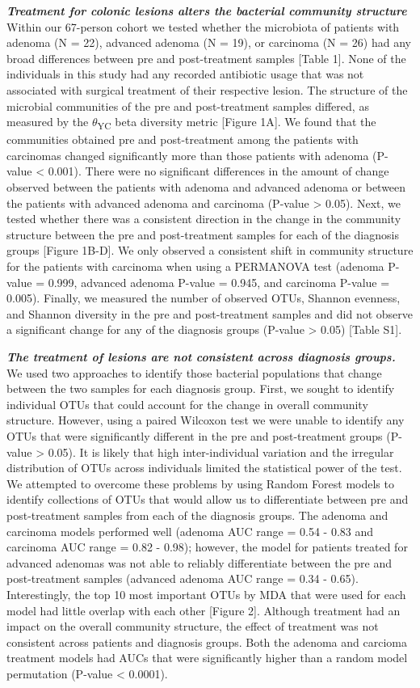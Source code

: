 \documentclass[12pt,]{article}
\begin{document}
\textbf{\emph{Treatment for colonic lesions alters the bacterial
community structure}} Within our 67-person cohort we tested whether the
microbiota of patients with adenoma (N = 22), advanced adenoma (N = 19),
or carcinoma (N = 26) had any broad differences between pre and
post-treatment samples {[}Table 1{]}. None of the individuals in this
study had any recorded antibiotic usage that was not associated with
surgical treatment of their respective lesion. The structure of the
microbial communities of the pre and post-treatment samples differed, as
measured by the \(\theta\)\textsubscript{YC} beta diversity metric
{[}Figure 1A{]}. We found that the communities obtained pre and
post-treatment among the patients with carcinomas changed significantly
more than those patients with adenoma (P-value \textless{} 0.001). There
were no significant differences in the amount of change observed between
the patients with adenoma and advanced adenoma or between the patients
with advanced adenoma and carcinoma (P-value \textgreater{} 0.05). Next,
we tested whether there was a consistent direction in the change in the
community structure between the pre and post-treatment samples for each
of the diagnosis groups {[}Figure 1B-D{]}. We only observed a consistent
shift in community structure for the patients with carcinoma when using
a PERMANOVA test (adenoma P-value = 0.999, advanced adenoma P-value =
0.945, and carcinoma P-value = 0.005). Finally, we measured the number
of observed OTUs, Shannon evenness, and Shannon diversity in the pre and
post-treatment samples and did not observe a significant change for any
of the diagnosis groups (P-value \textgreater{} 0.05) {[}Table S1{]}.

\textbf{\emph{The treatment of lesions are not consistent across
diagnosis groups.}} We used two approaches to identify those bacterial
populations that change between the two samples for each diagnosis
group. First, we sought to identify individual OTUs that could account
for the change in overall community structure. However, using a paired
Wilcoxon test we were unable to identify any OTUs that were
significantly different in the pre and post-treatment groups (P-value
\textgreater{} 0.05). It is likely that high inter-individual variation
and the irregular distribution of OTUs across individuals limited the
statistical power of the test. We attempted to overcome these problems
by using Random Forest models to identify collections of OTUs that would
allow us to differentiate between pre and post-treatment samples from
each of the diagnosis groups. The adenoma and carcinoma models performed
well (adenoma AUC range = 0.54 - 0.83 and carcinoma AUC range = 0.82 -
0.98); however, the model for patients treated for advanced adenomas was
not able to reliably differentiate between the pre and post-treatment
samples (advanced adenoma AUC range = 0.34 - 0.65). Interestingly, the
top 10 most important OTUs by MDA that were used for each model had
little overlap with each other {[}Figure 2{]}. Although treatment had an
impact on the overall community structure, the effect of treatment was
not consistent across patients and diagnosis groups. Both the adenoma
and carcioma treatment models had AUCs that were significantly higher
than a random model permutation (P-value \textless{} 0.0001).
\end{document}
